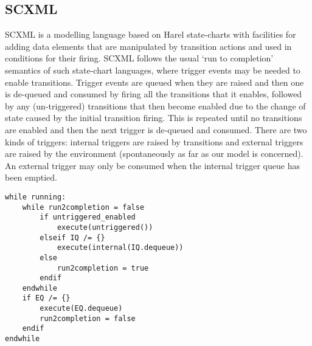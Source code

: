 

\subsection{SCXML}
\label{sec:scxml}

SCXML is a modelling language based on Harel state-charts with facilities for adding data elements that are manipulated by transition actions and used in conditions for their firing. SCXML follows the usual `run to completion' semantics of such state-chart languages, where trigger events may be needed to enable transitions. Trigger events are queued when they are raised and then one is de-queued and consumed by firing all the transitions that it enables, followed by any (un-triggered) transitions that then become enabled due to the change of state caused by the initial transition firing. This is repeated until no transitions are enabled and then the next trigger is de-queued and consumed. There are two kinds of triggers: internal triggers are raised by transitions and external triggers are raised by the environment (spontaneously as far as our model is concerned). An external trigger may only be consumed when the internal trigger queue has been emptied.

\begin{lstlisting}[caption=Pseudocode for 'run to completion']
while running:
	while run2completion = false
		if untriggered_enabled
			execute(untriggered())
		elseif IQ /= {}
			execute(internal(IQ.dequeue)) 
		else
			run2completion = true
		endif
	endwhile
	if EQ /= {}
		execute(EQ.dequeue) 
		run2completion = false
	endif
endwhile 
\end{lstlisting}


